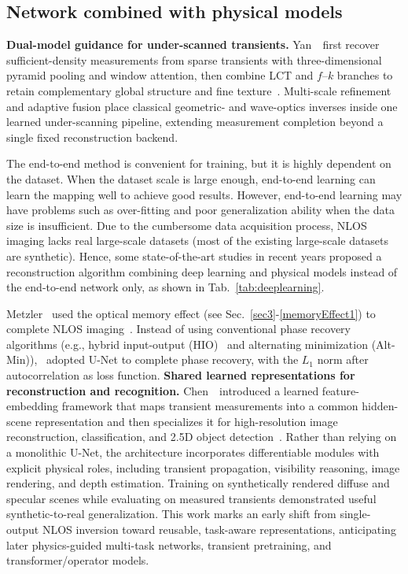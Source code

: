 \subsection{Network combined with physical models} \label{combined}

\vspace{0.8mm}
\noindent \textbf{Dual-model guidance for under-scanned transients.}
Yan~\etal~first recover sufficient-density measurements from sparse transients with three-dimensional pyramid pooling and window attention, then combine LCT and $f$--$k$ branches to retain complementary global structure and fine texture~\cite{yanDualModelUnderscanning2026}. Multi-scale refinement and adaptive fusion place classical geometric- and wave-optics inverses inside one learned under-scanning pipeline, extending measurement completion beyond a single fixed reconstruction backend.

The end-to-end method is convenient for training, but it is highly dependent on the dataset. When the dataset scale is large enough, end-to-end learning can learn the mapping well to achieve good results. However, end-to-end learning may have problems such as over-fitting and poor generalization ability when the data size is insufficient. Due to the cumbersome data acquisition process, NLOS imaging lacks real large-scale datasets (most of the existing large-scale datasets are synthetic). Hence, some state-of-the-art studies in recent years proposed a reconstruction algorithm combining deep learning and physical models instead of the end-to-end network only, as shown in Tab.~\ref{tab:deeplearning}.

Metzler \etal~used the optical memory effect (see Sec.~\ref{sec3}-\ref{memoryEffect1}) to complete NLOS imaging~\cite{metzlerDeepinverseCorrelographyRealtime2020}. Instead of using conventional phase recovery algorithms (e.g., hybrid input-output (HIO)~\cite{fienupPhaseRetrievalAlgorithms1982} and alternating minimization (Alt-Min)\cite{netrapalli_phase_2015}), \cite{metzlerDeepinverseCorrelographyRealtime2020}~adopted U-Net to complete phase recovery, with the $L_1$ norm after autocorrelation as loss function.
\vspace{0.8mm}
\noindent \textbf{Shared learned representations for reconstruction and recognition.}
Chen~\etal~introduced a learned feature-embedding framework that maps transient measurements into a common hidden-scene representation and then specializes it for high-resolution image reconstruction, classification, and 2.5D object detection~\cite{chen_learned_2020}. Rather than relying on a monolithic U-Net, the architecture incorporates differentiable modules with explicit physical roles, including transient propagation, visibility reasoning, image rendering, and depth estimation. Training on synthetically rendered diffuse and specular scenes while evaluating on measured transients demonstrated useful synthetic-to-real generalization. This work marks an early shift from single-output NLOS inversion toward reusable, task-aware representations, anticipating later physics-guided multi-task networks, transient pretraining, and transformer/operator models.

